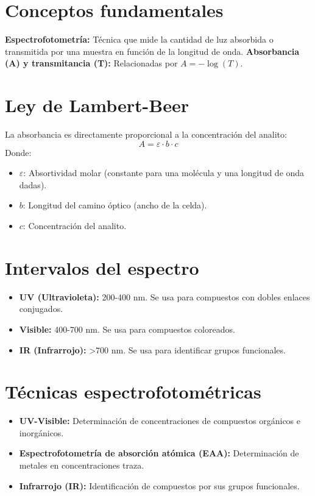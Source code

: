 \section{Conceptos fundamentales}

\textbf{Espectrofotometría:} Técnica que mide la cantidad de luz absorbida o transmitida por una muestra en función de la longitud de onda.
\textbf{Absorbancia (A) y transmitancia (T):} Relacionadas por $A = -\log(T)$.


\section{Ley de Lambert-Beer}
La absorbancia es directamente proporcional a la concentración del analito:
\[
A = \varepsilon \cdot b \cdot c
\]
Donde:
\begin{itemize}
    \item $\varepsilon$: Absortividad molar (constante para una molécula y una longitud de onda dadas).
    \item $b$: Longitud del camino óptico (ancho de la celda).
    \item $c$: Concentración del analito.
\end{itemize}

\section{Intervalos del espectro}
\begin{itemize}
    \item \textbf{UV (Ultravioleta):} 200-400 nm. Se usa para compuestos con dobles enlaces conjugados.
    \item \textbf{Visible:} 400-700 nm. Se usa para compuestos coloreados.
    \item \textbf{IR (Infrarrojo):} >700 nm. Se usa para identificar grupos funcionales.
\end{itemize}

\section{Técnicas espectrofotométricas}
\begin{itemize}
    \item \textbf{UV-Visible:} Determinación de concentraciones de compuestos orgánicos e inorgánicos.
    \item \textbf{Espectrofotometría de absorción atómica (EAA):} Determinación de metales en concentraciones traza.
    \item \textbf{Infrarrojo (IR):} Identificación de compuestos por sus grupos funcionales.
\end{itemize}

